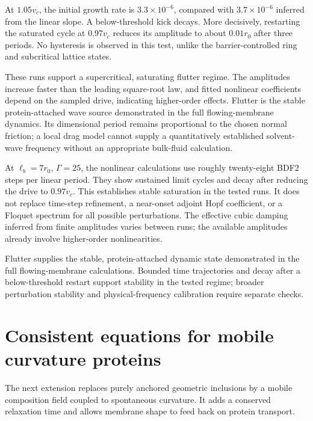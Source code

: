 At $1.05v_c$, the initial growth rate is $3.3\times10^{-6}$, compared with $3.7\times10^{-6}$ inferred from the linear slope. A below-threshold kick decays. More decisively, restarting the saturated cycle at $0.97v_c$ reduces its amplitude to about $0.01r_0$ after three periods. No hysteresis is observed in this test, unlike the barrier-controlled ring and subcritical lattice states.

These runs support a supercritical, saturating flutter regime. The amplitudes increase faster than the leading square-root law, and fitted nonlinear coefficients depend on the sampled drive, indicating higher-order effects. Flutter is the stable protein-attached wave source demonstrated in the full flowing-membrane dynamics. Its dimensional period remains proportional to the chosen normal friction; a local drag model cannot supply a quantitatively established solvent-wave frequency without an appropriate bulk-fluid calculation.


At $\ell_b=7r_0$, $\Gamma=25$, the nonlinear calculations use roughly twenty-eight BDF2 steps per linear period. They show sustained limit cycles and decay after reducing the drive to $0.97v_c$. This establishes stable saturation in the tested runs. It does not replace time-step refinement, a near-onset adjoint Hopf coefficient, or a Floquet spectrum for all possible perturbations. The effective cubic damping inferred from finite amplitudes varies between runs; the available amplitudes already involve higher-order nonlinearities.




Flutter supplies the stable, protein-attached dynamic state demonstrated in the full flowing-membrane calculations. Bounded time trajectories and decay after a below-threshold restart support stability in the tested regime; broader perturbation stability and physical-frequency calibration require separate checks.


\section{Consistent equations for mobile curvature proteins}\label{sec:proteins}
The next extension replaces purely anchored geometric inclusions by a mobile composition field coupled to spontaneous curvature. It adds a conserved relaxation time and allows membrane shape to feed back on protein transport.


